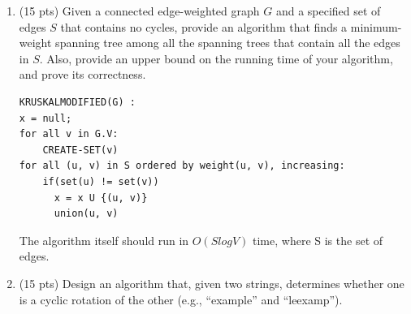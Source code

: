 \documentclass{article}
\begin{document}
\begin{enumerate}
\item (15 pts) Given a connected edge-weighted graph $G$ and a specified set of edges $S$ that contains no cycles, provide an algorithm that finds a minimum-weight spanning tree among all the spanning trees that contain all the edges in $S$. Also, provide an upper bound on the running time of your algorithm, and prove its correctness.

\begin{lstlisting}
KRUSKALMODIFIED(G) :
x = null;
for all v in G.V:
    CREATE-SET(v)
for all (u, v) in S ordered by weight(u, v), increasing:
    if(set(u) != set(v))
      x = x U {(u, v)}
      union(u, v)
\end{lstlisting}

The algorithm itself should run in $O(S log V)$ time, where S is the set of edges.

\newpage

\item (15 pts) Design an algorithm that, given two strings, determines whether one is a cyclic rotation of the other (e.g., ``example'' and ``leexamp'').

\end{enumerate}
\end{document}
